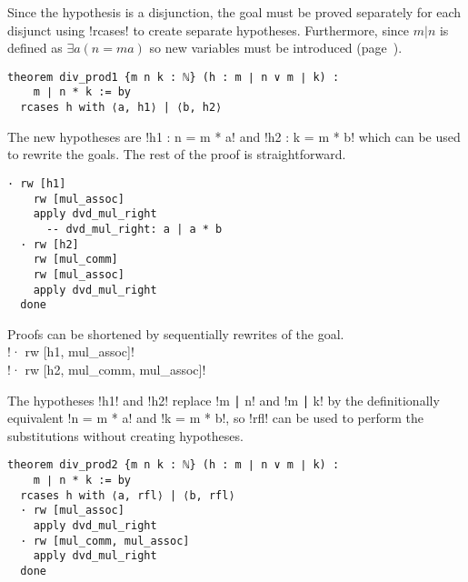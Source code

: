 Since the hypothesis is a disjunction, the goal must be proved separately for each disjunct using !rcases! to create separate hypotheses. Furthermore, since $m|n$ is defined as $\exists a (n=ma)$ so new variables must be introduced (page~\pageref{p.rcases}).
\begin{Verbatim}
theorem div_prod1 {m n k : ℕ} (h : m ∣ n ∨ m ∣ k) :
    m ∣ n * k := by
  rcases h with ⟨a, h1⟩ | ⟨b, h2⟩
\end{Verbatim}
The new hypotheses are !h1 : n = m * a! and !h2 : k = m * b! which can be used to rewrite the goals. The rest of the proof is straightforward.
\begin{Verbatim}[firstnumber=last]
  · rw [h1]
    rw [mul_assoc]
    apply dvd_mul_right
      -- dvd_mul_right: a | a * b
  · rw [h2]
    rw [mul_comm]
    rw [mul_assoc]
    apply dvd_mul_right
  done
\end{Verbatim}

Proofs can be shortened by sequentially rewrites of the goal.\\
\indnt{}!· rw [h1, mul_assoc]!\\
\indnt{}!· rw [h2, mul_comm, mul_assoc]!

The hypotheses !h1! and !h2! replace !m ∣ n! and !m ∣ k! by the definitionally equivalent !n = m * a! and !k = m * b!, so !rfl! can be used to perform the substitutions without creating hypotheses.
\begin{Verbatim}
theorem div_prod2 {m n k : ℕ} (h : m ∣ n ∨ m ∣ k) :
    m ∣ n * k := by
  rcases h with ⟨a, rfl⟩ | ⟨b, rfl⟩
  · rw [mul_assoc]
    apply dvd_mul_right
  · rw [mul_comm, mul_assoc]
    apply dvd_mul_right
  done
\end{Verbatim}
